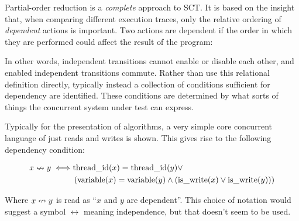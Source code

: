 Partial-order reduction is a \emph{complete} approach to SCT. It is
based on the insight that, when comparing different execution traces,
only the relative ordering of \emph{dependent} actions is
important. Two actions are dependent if the order in which they are
performed could affect the result of the program:


In other words, independent transitions cannot enable or disable each
other, and enabled independent transitions commute. Rather than use
this relational definition directly, typically instead a collection of
conditions sufficient for dependency are identified. These conditions
are determined by what sorts of things the concurrent system under
test can express.

Typically for the presentation of algorithms, a very simple core
concurrent language of just reads and writes is shown. This gives rise
to the following dependency condition:

\begin{align*}
  x \nleftrightarrow y \iff& \mathrm{thread\_id}(x) = \mathrm{thread\_id}(y) \lor\\
    &\left(\mathrm{variable}(x) = \mathrm{variable}(y)
     \land \left(\mathrm{is\_write}(x) \lor \mathrm{is\_write}(y)\right)\right)
\end{align*}

Where $x \nleftrightarrow y$ is read as ``$x$ and $y$ are dependent''. This
choice of notation would suggest a symbol $\leftrightarrow$ meaning
independence, but that doesn't seem to be used.

